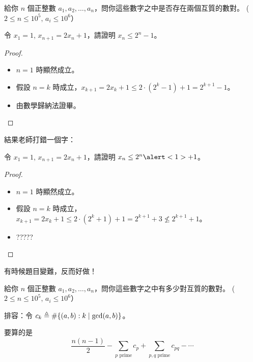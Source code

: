 \documentclass[standalone]{beamer}
\begin{document}
\begin{frame}{}
  \begin{problem}
    給你 $n$ 個正整數 $a_1, a_2, \dots, a_n$，問你這些數字之中是否存在兩個互質的數對。
    ($2 \leq n \leq 10^5, \, a_i \leq 10^6$）
  \end{problem}
\end{frame}

\begin{frame}{}
  \begin{problem}[數學歸納法考題]
    令 $x_1 = 1$, $x_{n+1} = 2x_n + 1$，請證明 $x_{n} \leq 2^n - 1$。
  \end{problem} \pause
  \begin{proof}
    \begin{itemize}[<+->]
      \item $n = 1$ 時顯然成立。
      \item 假設 $n = k$ 時成立，$x_{k+1} = 2x_k + 1 \leq 2\cdot(2^k - 1) + 1 = 2^{k+1} - 1$。
      \item 由數學歸納法證畢。
    \end{itemize}
  \end{proof}
\end{frame}

\begin{frame}{}
  結果老師打錯一個字：
  \begin{problem}
    令 $x_1 = 1$, $x_{n+1} = 2x_n + 1$，請證明 $x_{n} \leq 2^n \alert<1>{+} 1$。
  \end{problem} \pause
  \begin{proof}
    \begin{itemize}[<+->]
      \item $n = 1$ 時顯然成立。
      \item 假設 $n = k$ 時成立，$x_{k+1} = 2x_k + 1 \leq 2\cdot(2^k + 1) + 1 = 2^{k+1} + 3 \nleq 2^{k+1} + 1$。
      \item ?????
    \end{itemize}
  \end{proof}
\end{frame}

\begin{frame}{}
  有時候題目變難，反而好做！ \pause

  \begin{problem}
    給你 $n$ 個正整數 $a_1, a_2, \dots, a_n$，問你這些數字之中\alert<2>{有多少對互質的數對}。
    ($2 \leq n \leq 10^5, \, a_i \leq 10^6$）
  \end{problem} \pause
  排容：令 $c_k \defeq \sharp\{ (a, b) : k \mid \gcd(a, b) \}$。\pause

  要算的是
  \[ 
    \frac{n(n-1)}{2} - \sum_{p \text{ prime}} c_p + \sum_{p,q \text{ prime}} c_{pq} - \dotsm
  \]
\end{frame}
\end{document}
